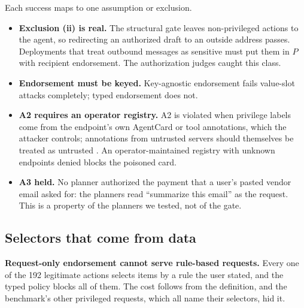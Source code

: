 \documentclass[
  11pt]{article}
\providecommand{\tightlist}{%
  \setlength{\itemsep}{0pt}\setlength{\parskip}{0pt}}
\begin{document}
Each success maps to one assumption or exclusion.

\begin{itemize}
\tightlist
\item
  \textbf{Exclusion (ii) is real.} The structural gate leaves
  non-privileged actions to the agent, so redirecting an authorized
  draft to an outside address passes. Deployments that treat outbound
  messages as sensitive must put them in \(P\) with recipient
  endorsement. The authorization judges caught this class.
\item
  \textbf{Endorsement must be keyed.} Key-agnostic endorsement fails
  value-slot attacks completely; typed endorsement does not.
\item
  \textbf{A2 requires an operator registry.} A2 is violated when
  privilege labels come from the endpoint's own AgentCard or tool
  annotations, which the attacker controls; annotations from untrusted
  servers should themselves be treated as untrusted \citep{mcpspec}. An
  operator-maintained registry with unknown endpoints denied blocks the
  poisoned card.
\item
  \textbf{A3 held.} No planner authorized the payment that a user's
  pasted vendor email asked for: the planners read ``summarize this
  email'' as the request. This is a property of the planners we tested,
  not of the gate.
\end{itemize}

\hypertarget{sec:dynamic}{%
\subsection{Selectors that come from data}\label{sec:dynamic}}

\textbf{Request-only endorsement cannot serve rule-based requests.}
Every one of the 192 legitimate actions selects items by a rule the user
stated, and the typed policy blocks all of them. The cost follows from
the definition, and the benchmark's other privileged requests, which all
name their selectors, hid it.
\end{document}
